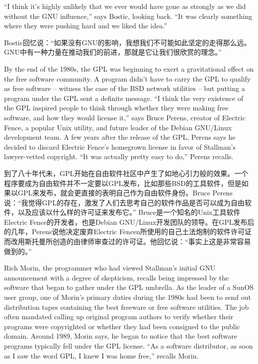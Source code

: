 \ifdefined\eng
``I think it's highly unlikely that we ever would have gone as strongly as we did without the GNU influence,'' says Bostic, looking back. ``It was clearly something where they were pushing hard and we liked the idea.''
\fi

\ifdefined\chs
Bostic回忆说：“如果没有GNU的影响，我想我们不可能如此坚定的走得那么远。GNU中有一种力量在推动我们的前进，那就是它让我们很欣赏的理念。”
\fi

\ifdefined\eng
By the end of the 1980s, the GPL was beginning to exert a gravitational effect on the free software community. A program didn't have to carry the GPL to qualify as free software -- witness the case of the BSD network utilities -- but putting a program under the GPL sent a definite message. ``I think the very existence of the GPL inspired people to think through whether they were making free software, and how they would license it,'' says Bruce Perens, creator of Electric Fence, a popular Unix utility, and future leader of the Debian GNU/Linux development team. A few years after the release of the GPL, Perens says he decided to discard Electric Fence's homegrown license in favor of Stallman's lawyer-vetted copyright. ``It was actually pretty easy to do,'' Perens recalls.
\fi

\ifdefined\chs
到了八十年代未，GPL开始在自由软件社区中产生了如地心引力般的效果。一个程序要成为自由软件并不一定要以GPL发布，比如那些BSD的工具软件，但是如果以GPL来发布，就会更直接的表明自己作为自由软件身份。Bruce Perens说：“我觉得GPL的存在，激发了人们去思考自己的软件作品是否可以成为自由软件，以及应该以什么样的许可证来发布它。” Bruce是一个知名的Unix工具软件Electric Fence的开发者，也是Debian GNU/Linux开发团队的领导。在GPL发布后的几年，Perens说他决定废弃Electric Fencen所使用的自己土法炮制的软件许可证而改用斯托曼所创造的由律师审查过的许可证。他回忆说：“事实上这是非常容易做到的。”
\fi

\ifdefined\eng
Rich Morin, the programmer who had viewed Stallman's initial GNU announcement with a degree of skepticism, recalls being impressed by the software that began to gather under the GPL umbrella. As the leader of a SunOS user group, one of Morin's primary duties during the 1980s had been to send out distribution tapes containing the best freeware or free software utilities. The job often mandated calling up original program authors to verify whether their programs were copyrighted or whether they had been consigned to the public domain. Around 1989, Morin says, he began to notice that the best software programs typically fell under the GPL license. ``As a software distributor, as soon as I saw the word GPL, I knew I was home free,'' recalls Morin.
\fi

